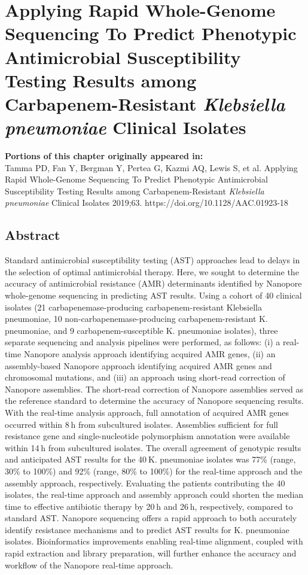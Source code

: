 \chapter{Applying Rapid Whole-Genome Sequencing To Predict Phenotypic Antimicrobial Susceptibility Testing Results among Carbapenem-Resistant \textit{Klebsiella pneumoniae} Clinical Isolates}
\label{chap:amr}

\textbf{Portions of this chapter originally appeared in:} \\
Tamma PD, Fan Y, Bergman Y, Pertea G, Kazmi AQ, Lewis S, et al. Applying Rapid Whole-Genome Sequencing To Predict Phenotypic Antimicrobial Susceptibility Testing Results among Carbapenem-Resistant \textit{Klebsiella pneumoniae} Clinical Isolates 2019;63. https://doi.org/10.1128/AAC.01923-18

\section{Abstract}
\label{sec:abstract}

Standard antimicrobial susceptibility testing (AST) approaches lead to delays in the selection of optimal antimicrobial therapy. Here, we sought to determine the accuracy of antimicrobial resistance (AMR) determinants identified by Nanopore whole-genome sequencing in predicting AST results. Using a cohort of 40 clinical isolates (21 carbapenemase-producing carbapenem-resistant Klebsiella pneumoniae, 10 non-carbapenemase-producing carbapenem-resistant K. pneumoniae, and 9 carbapenem-susceptible K. pneumoniae isolates), three separate sequencing and analysis pipelines were performed, as follows: (i) a real-time Nanopore analysis approach identifying acquired AMR genes, (ii) an assembly-based Nanopore approach identifying acquired AMR genes and chromosomal mutations, and (iii) an approach using short-read correction of Nanopore assemblies. The short-read correction of Nanopore assemblies served as the reference standard to determine the accuracy of Nanopore sequencing results. With the real-time analysis approach, full annotation of acquired AMR genes occurred within 8 h from subcultured isolates. Assemblies sufficient for full resistance gene and single-nucleotide polymorphism annotation were available within 14 h from subcultured isolates. The overall agreement of genotypic results and anticipated AST results for the 40 K. pneumoniae isolates was 77\% (range, 30\% to 100\%) and 92\% (range, 80\% to 100\%) for the real-time approach and the assembly approach, respectively. Evaluating the patients contributing the 40 isolates, the real-time approach and assembly approach could shorten the median time to effective antibiotic therapy by 20 h and 26 h, respectively, compared to standard AST. Nanopore sequencing offers a rapid approach to both accurately identify resistance mechanisms and to predict AST results for K. pneumoniae isolates. Bioinformatics improvements enabling real-time alignment, coupled with rapid extraction and library preparation, will further enhance the accuracy and workflow of the Nanopore real-time approach.

